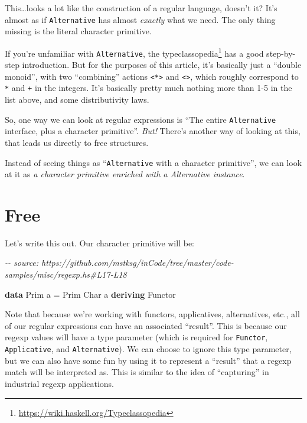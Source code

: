 \documentclass[]{article}
\newenvironment{Shaded}{}{}
\newcommand{\CommentTok}[1]{\textcolor[rgb]{0.38,0.63,0.69}{\textit{#1}}}
\newcommand{\DataTypeTok}[1]{\textcolor[rgb]{0.56,0.13,0.00}{#1}}
\newcommand{\KeywordTok}[1]{\textcolor[rgb]{0.00,0.44,0.13}{\textbf{#1}}}
\newcommand{\NormalTok}[1]{#1}
\newcommand{\OtherTok}[1]{\textcolor[rgb]{0.00,0.44,0.13}{#1}}
\renewcommand{\href}[2]{#2\footnote{\url{#1}}}
\begin{document}
This\ldots looks a lot like the construction of a regular language, doesn't it?
It's almost as if \texttt{Alternative} has almost \emph{exactly} what we need.
The only thing missing is the literal character primitive.

If you're unfamiliar with \texttt{Alternative}, the
\href{https://wiki.haskell.org/Typeclassopedia}{typeclassopedia} has a good
step-by-step introduction. But for the purposes of this article, it's basically
just a ``double monoid'', with two ``combining'' actions
\texttt{\textless{}*\textgreater{}} and
\texttt{\textless{}\textbar{}\textgreater{}}, which roughly correspond to
\texttt{*} and \texttt{+} in the integers. It's basically pretty much nothing
more than 1-5 in the list above, and some distributivity laws.

So, one way we can look at regular expressions is ``The entire
\texttt{Alternative} interface, plus a character primitive''. \emph{But!}
There's another way of looking at this, that leads us directly to free
structures.

Instead of seeing things as ``\texttt{Alternative} with a character primitive'',
we can look at it as \emph{a character primitive enriched with a Alternative
instance}.

\section{Free}\label{free}

Let's write this out. Our character primitive will be:

\begin{Shaded}
\begin{Highlighting}[]
\CommentTok{{-}{-} source: https://github.com/mstksg/inCode/tree/master/code{-}samples/misc/regexp.hs\#L17{-}L18}

\KeywordTok{data} \DataTypeTok{Prim}\NormalTok{ a }\OtherTok{=} \DataTypeTok{Prim} \DataTypeTok{Char}\NormalTok{ a}
  \KeywordTok{deriving} \DataTypeTok{Functor}
\end{Highlighting}
\end{Shaded}

Note that because we're working with functors, applicatives, alternatives, etc.,
all of our regular expressions can have an associated ``result''. This is
because our regexp values will have a type parameter (which is required for
\texttt{Functor}, \texttt{Applicative}, and \texttt{Alternative}). We can choose
to ignore this type parameter, but we can also have some fun by using it to
represent a ``result'' that a regexp match will be interpreted as. This is
similar to the idea of ``capturing'' in industrial regexp applications.
\end{document}
